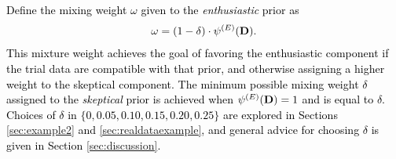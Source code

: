 \documentclass[12pt]{article}
\begin{document}
\textcolor{black}{
Define the mixing weight $\omega$ given to the \textit{enthusiastic} prior as
\begin{align}\label{eq:omega}
\omega= (1 - \delta)\cdot\psi^{(E)}(\textcolor{black}{\mathbf{D}}).
\end{align}
This mixture weight achieves the goal of favoring the enthusiastic component if the trial data are compatible with that prior, and otherwise assigning a higher weight to the skeptical component. The minimum possible mixing weight $\delta$ assigned to the \textit{skeptical} prior is achieved when $\psi^{(E)}(\textcolor{black}{\mathbf{D}})=1$ and is equal to $\delta$. Choices of $\delta$ in $\{0, 0.05, 0.10, 0.15, 0.20, 0.25\}$ are explored in Sections \ref{sec:example2} and \ref{sec:realdataexample}, and general advice for choosing $\delta$ is given in Section \ref{sec:discussion}.}
%
%
\end{document}
